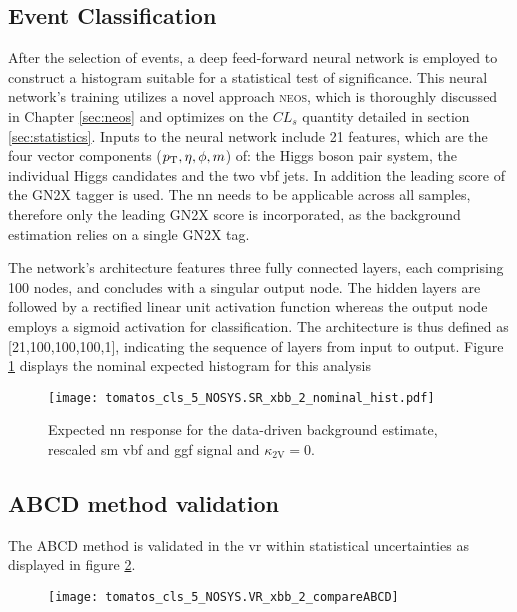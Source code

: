 \subsection{Event Classification}
After the selection of events, a deep feed-forward neural network is employed to construct a histogram suitable for a statistical test of significance. This neural network's training utilizes a novel approach \textsc{neos}, which is thoroughly discussed in Chapter \ref{sec:neos} and optimizes on the $CL_s$ quantity detailed in section \ref{sec:statistics}. Inputs to the neural network include 21 features, which are the four vector components ($p_{\text{T}},\eta,\phi,m$) of: the Higgs boson pair system, the individual Higgs candidates and the two \ac{vbf} jets. In addition the leading score of the GN2X tagger is used. The \ac{nn} needs to be applicable across all samples, therefore only the leading GN2X score is incorporated, as the background estimation relies on a single GN2X tag.

The network's architecture features three fully connected layers, each comprising 100 nodes, and concludes with a singular output node. The hidden layers are followed by a rectified linear unit activation function whereas the output node employs a sigmoid activation for classification. The architecture is thus defined as [21,100,100,100,1], indicating the sequence of layers from input to output. Figure \ref{fig:nominal-hist} displays the nominal expected histogram for this analysis

\begin{figure}
    \centering
    \texttt{[image: tomatos\_cls\_5\_NOSYS.SR\_xbb\_2\_nominal\_hist.pdf]}
    \caption[]{Expected \ac{nn} response for the data-driven background estimate, rescaled \ac{sm}  \ac{vbf} and \ac{ggf} signal and $\kappa_\text{2V}=0$.}
    \label{fig:nominal-hist}
\end{figure}

\subsection{ABCD method validation}
The ABCD method is validated in the \ac{vr} within statistical uncertainties as displayed in figure \ref{fig:bkg-validation}. 
\begin{figure}
    \centering
    \texttt{[image: tomatos\_cls\_5\_NOSYS.VR\_xbb\_2\_compareABCD]}
    \caption[]{}
    \label{fig:bkg-validation}
\end{figure}


